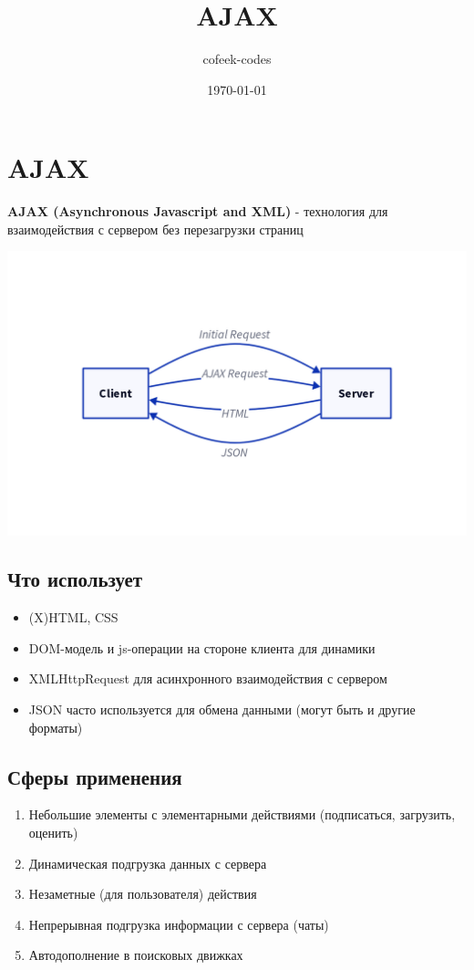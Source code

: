 \documentclass[11pt]{article}
\author{cofeek-codes}
\date{\today}
\title{AJAX}
\begin{document}
\maketitle
\tableofcontents


\section{AJAX}
\label{sec:orga5f6d96}

\textbf{AJAX (Asynchronous Javascript and XML)} - технология для взаимодействия с сервером без перезагрузки страниц

\begin{center}
\includegraphics[width=.9\linewidth]{./schema.png}
\end{center}

\subsection{Что использует}
\label{sec:org658e1e9}

\begin{itemize}
\item (X)HTML, CSS
\item DOM-модель и js-операции на стороне клиента для динамики
\item XMLHttpRequest для асинхронного взаимодействия с сервером
\item JSON часто используется для обмена данными (могут быть и другие форматы)
\end{itemize}

\subsection{Сферы применения}
\label{sec:org0e70e0a}

\begin{enumerate}
\item Небольшие элементы с элементарными действиями (подписаться, загрузить, оценить)
\item Динамическая подгрузка данных с сервера
\item Незаметные (для пользователя) действия
\item Непрерывная подгрузка информации с сервера (чаты)
\item Автодополнение в поисковых движках
\end{enumerate}
\end{document}

